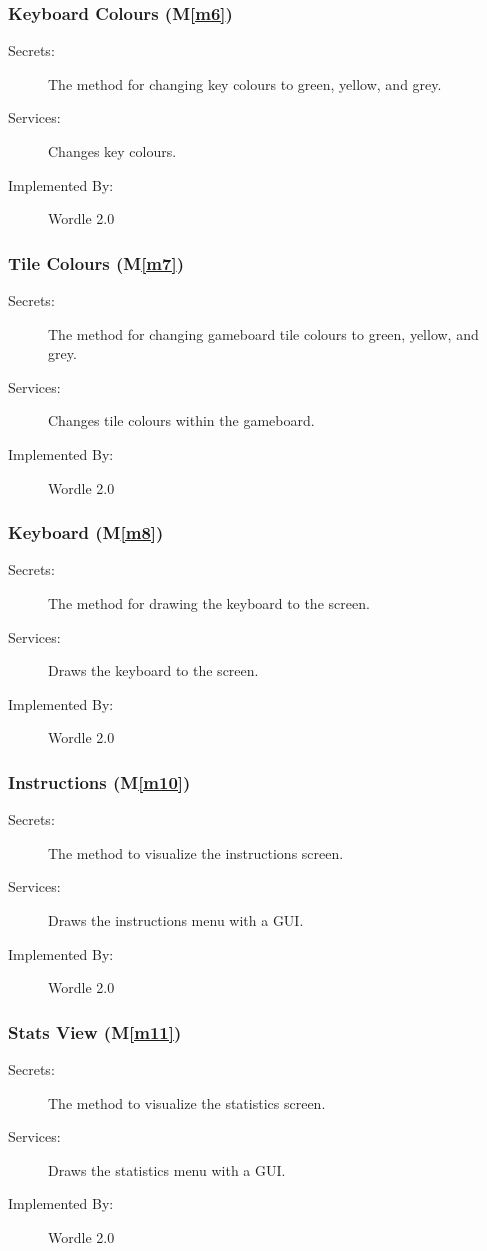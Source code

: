 \documentclass[12pt, titlepage]{article}
\newcommand{\mref}[1]{M\ref{#1}}
\begin{document}
	\subsubsection{Keyboard Colours (\mref{m6})}
	\begin{description}
		\item[Secrets:]The method for changing key colours to green, yellow, and grey.
		\item[Services:]Changes key colours.
		\item[Implemented By:] Wordle 2.0
	\end{description}
	
	\subsubsection{Tile Colours (\mref{m7})}
	\begin{description}
		\item[Secrets:]The method for changing gameboard tile colours to green, yellow, and grey.
		\item[Services:]Changes tile colours within the gameboard.
		\item[Implemented By:] Wordle 2.0
	\end{description}
	
	\subsubsection{Keyboard (\mref{m8})}
	\begin{description}
		\item[Secrets:]The method for drawing the keyboard to the screen.
		\item[Services:]Draws the keyboard to the screen.
		\item[Implemented By:] Wordle 2.0
	\end{description}
	
	\subsubsection{Instructions (\mref{m10})}
	\begin{description}
		\item[Secrets:]The method to visualize the instructions screen.
		\item[Services:]Draws the instructions menu with a GUI.
		\item[Implemented By:] Wordle 2.0
	\end{description}
	
	\subsubsection{Stats View (\mref{m11})}
	\begin{description}
		\item[Secrets:]The method to visualize the statistics screen.
		\item[Services:]Draws the statistics menu with a GUI.
		\item[Implemented By:] Wordle 2.0
	\end{description}
	
\end{document}
